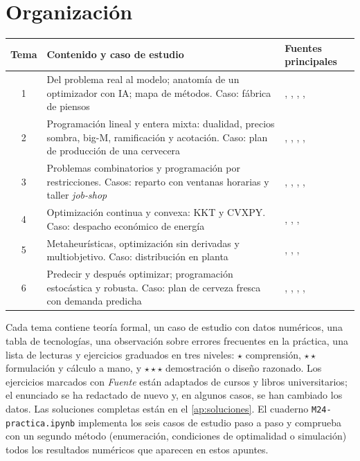 \documentclass[11pt,a4paper,twoside,openany]{book}
\begin{document}
\section*{Organización}
\begin{center}\small
\begin{tabularx}{\textwidth}{@{}c>{\raggedright\arraybackslash}X>{\raggedright\arraybackslash}p{4.2cm}@{}}
\toprule
Tema & Contenido y caso de estudio & Fuentes principales \\
\midrule
1 & Del problema real al modelo; anatomía de un optimizador con IA; mapa de métodos. Caso: fábrica de piensos & \cite{bt}, \cite{mit15053}, \cite{kw}, \cite{deepmind}, \cite{orion} \\
2 & Programación lineal y entera mixta: dualidad, precios sombra, big-M, ramificación y acotación. Caso: plan de producción de una cervecera & \cite{bt}, \cite{amp}, \cite{mit15053}, \cite{landdoig}, \cite{highs} \\
3 & Problemas combinatorios y programación por restricciones. Casos: reparto con ventanas horarias y taller \emph{job-shop} & \cite{mit15053}, \cite{solomon}, \cite{ortools-vrptw}, \cite{ortools-js}, \cite{johnson} \\
4 & Optimización continua y convexa: KKT y CVXPY. Caso: despacho económico de energía & \cite{bv}, \cite{nw}, \cite{wood}, \cite{cvxpy} \\
5 & Metaheurísticas, optimización sin derivadas y multiobjetivo. Caso: distribución en planta & \cite{kw}, \cite{kirkpatrick}, \cite{hansen}, \cite{nsga2} \\
6 & Predecir y después optimizar; programación estocástica y robusta. Caso: plan de cerveza fresca con demanda predicha & \cite{bl}, \cite{ee364stoch}, \cite{spo}, \cite{bk}, \cite{bsim} \\
\bottomrule
\end{tabularx}
\end{center}

Cada tema contiene teoría formal, un caso de estudio con datos numéricos, una tabla de tecnologías, una observación sobre errores frecuentes en la práctica, una lista de lecturas y ejercicios graduados en tres niveles: $\star$ comprensión, $\star\star$ formulación y cálculo a mano, y $\star\star\star$ demostración o diseño razonado. Los ejercicios marcados con \emph{Fuente} están adaptados de cursos y libros universitarios; el enunciado se ha redactado de nuevo y, en algunos casos, se han cambiado los datos. Las soluciones completas están en el \cref{ap:soluciones}. El cuaderno \texttt{M24-practica.ipynb} implementa los seis casos de estudio paso a paso y comprueba con un segundo método (enumeración, condiciones de optimalidad o simulación) todos los resultados numéricos que aparecen en estos apuntes.
\end{document}
